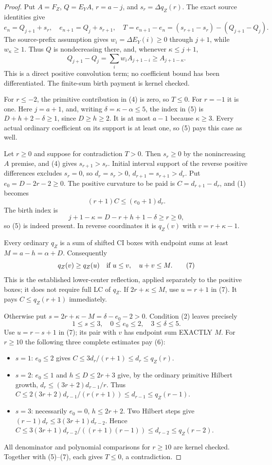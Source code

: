 \begin{proof}
Put $A=F_Z$, $Q=E_Y A$, $r=a-j$, and $s_r=\Delta q_Z(r)$.
The exact source identities give
\[
 e_n=Q_{j+1}+s_r,\quad e_{n+1}=Q_j+s_{r+1},\quad
 T=e_{n+1}-e_n=(s_{r+1}-s_r)-(Q_{j+1}-Q_j).          \tag{4}
\]
The source-prefix assumption gives
$w_i=\Delta E_Y(i)\ge0$ through $j+1$, while $w_\kappa\ge1$.
Thus $Q$ is nondecreasing there, and, whenever $\kappa\le j+1$,
\[
             Q_{j+1}-Q_j=\sum_i w_i A_{j+1-i}
                                      \ge A_{j+1-\kappa}.       \tag{5}
\]
This is a direct positive convolution term; no coefficient bound
has been differentiated. The finite-sum birth payment is kernel checked.

For $r\le-2$, the primitive contribution in (4) is zero, so $T\le0$.
For $r=-1$ it is one. Here $j=a+1$, and, writing
$\delta=\kappa-\alpha\le5$, the index in (5) is
$D+h+2-\delta\ge1$, since $D\ge h\ge2$.
It is at most $a-1$ because $\kappa\ge3$.
Every actual ordinary coefficient on its support is at least one,
so (5) pays this case as well.

Let $r\ge0$ and suppose for contradiction $T>0$.
Then $s_r\ge0$ by the nonincreasing $A$ premise, and (4) gives
$s_{r+1}>s_r$. Initial interval support of the reverse positive
differences excludes $s_r=0$, so
$d_r=s_r>0$, $d_{r+1}=s_{r+1}>d_r$.
Put $e_0=D-2r-2\ge0$. The positive curvature to be paid is
$C=d_{r+1}-d_r$, and (1) becomes
\[
                         (r+1)C\le(e_0+1)d_r.         \tag{6}
\]
The birth index is
\[
 j+1-\kappa=D-r+h+1-\delta\ge r\ge0,
\]
so (5) is indeed present. In reverse coordinates it is
$q_Z(v)$ with $v=r+\kappa-1$.

Every ordinary $q_Z$ is a sum of shifted CI boxes with endpoint
sums at least $M=a-h=\alpha+D$. Consequently
\[
          q_Z(v)\ge q_Z(u)\quad\hbox{if }u\le v,\quad u+v\le M.
                                                               \tag{7}
\]
This is the established lower-center reflection, applied separately
to the positive boxes; it does not require full LC of $q_Z$.
If $2r+\kappa\le M$, use $u=r+1$ in (7).
It pays $C\le q_Z(r+1)$ immediately.

Otherwise put $s=2r+\kappa-M=\delta-e_0-2>0$.
Condition (2) leaves precisely
\[
 1\le s\le3,\quad0\le e_0\le2,\quad3\le\delta\le5.
\]
Use $u=r-s+1$ in (7); its pair with $v$ has endpoint sum EXACTLY $M$.
For $r\ge10$ the following three complete estimates pay (6):
\begin{itemize}
\item $s=1$: $e_0\le2$ gives $C\le3d_r/(r+1)\le d_r\le q_Z(r)$.
\item $s=2$: $e_0\le1$ and $h\le D\le2r+3$ give, by the ordinary
primitive Hilbert growth,
$d_r\le(3r+2)d_{r-1}/r$.
Thus $C\le2(3r+2)d_{r-1}/(r(r+1))\le d_{r-1}\le q_Z(r-1)$.
\item $s=3$: necessarily $e_0=0$, $h\le2r+2$.
Two Hilbert steps give
$(r-1)d_r\le3(3r+1)d_{r-2}$.
Hence $C\le3(3r+1)d_{r-2}/((r+1)(r-1))\le d_{r-2}\le q_Z(r-2)$.
\end{itemize}
All denominator and polynomial comparisons for $r\ge10$ are kernel
checked. Together with (5)--(7), each gives $T\le0$, a contradiction.


\end{proof}
